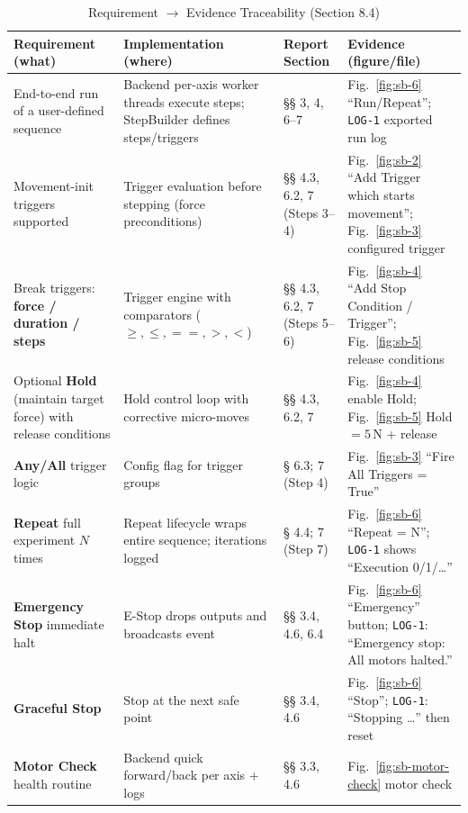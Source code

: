 \documentclass[
    twocolumn,
    fontsize = 10pt,
    parskip = half+,
    headings = small,
    headwidth = text,
    footwidth = text,
]{scrartcl}
\renewcommand{\arraystretch}{1.15}
\begin{document}
\begin{table}[t]
\centering
\caption{Requirement $\rightarrow$ Evidence Traceability (Section 8.4)}
\label{tab:traceability-a}
\setlength{\tabcolsep}{4pt}
\renewcommand{\arraystretch}{1.15}
\footnotesize
\begin{tabularx}{\textwidth}{@{}p{}YYY@{}}
\toprule
\textbf{Requirement (what)} & \textbf{Implementation (where)} & \textbf{Report Section} & \textbf{Evidence (figure/file)} \\
\midrule
End-to-end run of a user-defined sequence
& Backend per-axis worker threads execute steps; StepBuilder defines steps/triggers
& §§ 3, 4, 6–7
& Fig.~\ref{fig:sb-6} “Run/Repeat”; \texttt{LOG-1} exported run log \\
Movement-init triggers supported
& Trigger evaluation before stepping (force preconditions)
& §§ 4.3, 6.2, 7 (Steps 3–4)
& Fig.~\ref{fig:sb-2} “Add Trigger which starts movement”; Fig.~\ref{fig:sb-3} configured trigger \\
Break triggers: \textbf{force / duration / steps}
& Trigger engine with comparators ($\ge, \le, ==, >, <$)
& §§ 4.3, 6.2, 7 (Steps 5–6)
& Fig.~\ref{fig:sb-4} “Add Stop Condition / Trigger”; Fig.~\ref{fig:sb-5} release conditions \\
Optional \textbf{Hold} (maintain target force) with release conditions
& Hold control loop with corrective micro-moves
& §§ 4.3, 6.2, 7
& Fig.~\ref{fig:sb-4} enable Hold; Fig.~\ref{fig:sb-5} Hold $=5$\,N + release \\
\textbf{Any/All} trigger logic
& Config flag for trigger groups
& § 6.3; 7 (Step 4)
& Fig.~\ref{fig:sb-3} “Fire All Triggers = True” \\
\textbf{Repeat} full experiment $N$ times
& Repeat lifecycle wraps entire sequence; iterations logged
& § 4.4; 7 (Step 7)
& Fig.~\ref{fig:sb-6} “Repeat = N”; \texttt{LOG-1} shows “Execution 0/1/…” \\
\textbf{Emergency Stop} immediate halt
& E-Stop drops outputs and broadcasts event
& §§ 3.4, 4.6, 6.4
& Fig.~\ref{fig:sb-6} “Emergency” button; \texttt{LOG-1}: “Emergency stop: All motors halted.” \\
\textbf{Graceful Stop}
& Stop at the next safe point
& §§ 3.4, 4.6
& Fig.~\ref{fig:sb-6} “Stop”; \texttt{LOG-1}: “Stopping …” then reset \\
\textbf{Motor Check} health routine
& Backend quick forward/back per axis + logs
& §§ 3.3, 4.6
& Fig.~\ref{fig:sb-motor-check} motor check \\

\end{tabularx}
\end{table}
\end{document}
